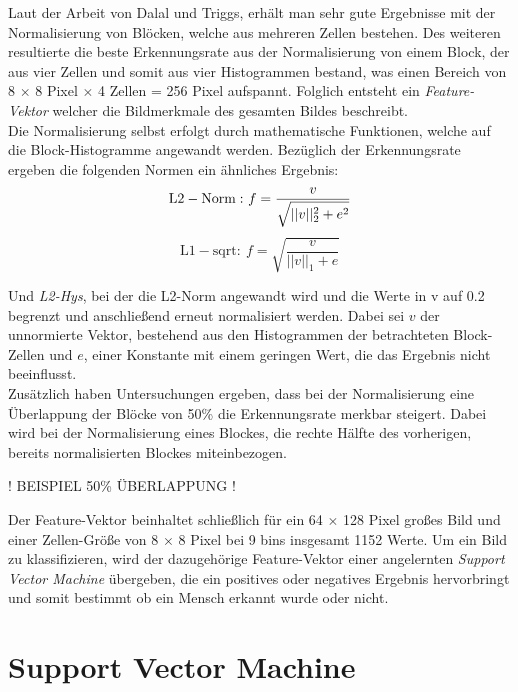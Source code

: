 Laut der Arbeit von Dalal und Triggs, erhält man sehr gute Ergebnisse mit der Normalisierung von Blöcken, welche aus mehreren Zellen bestehen. Des weiteren resultierte die beste Erkennungsrate aus der Normalisierung von einem Block, der aus vier Zellen und somit aus vier Histogrammen bestand, was einen Bereich von 8 $\times$ 8 Pixel $\times$ 4 Zellen = 256 Pixel aufspannt.
Folglich entsteht ein \emph{Feature-Vektor} welcher die Bildmerkmale des gesamten Bildes beschreibt.\\
Die Normalisierung selbst erfolgt durch mathematische Funktionen, welche auf die Block-Histogramme angewandt werden. Bezüglich der Erkennungsrate ergeben die folgenden Normen ein ähnliches Ergebnis:
$$\mathrm{L2-Norm:\ } f=\frac{v}{\sqrt{\strut{\lvert\lvert v \rvert\rvert^2_2+e^{2}}}}$$
\vspace{5 mm}
$$\mathrm{L1-sqrt:\ } f=\sqrt{\frac{v}{\lvert\lvert v \rvert\rvert_1+e}}$$

Und \emph{L2-Hys}, bei der die L2-Norm angewandt wird und die Werte in v auf 0.2 begrenzt und anschließend erneut normalisiert werden. Dabei sei $v$ der unnormierte Vektor, bestehend aus den Histogrammen der betrachteten Block-Zellen und $e$, einer Konstante mit einem geringen Wert, die das Ergebnis nicht beeinflusst.\\
Zusätzlich haben Untersuchungen ergeben, dass bei der Normalisierung eine Überlappung der Blöcke von 50\% die Erkennungsrate merkbar steigert. Dabei wird bei der Normalisierung eines Blockes, die rechte Hälfte des vorherigen, bereits normalisierten Blockes miteinbezogen.

\vspace{5 mm}
! BEISPIEL 50\% ÜBERLAPPUNG !
\vspace{5 mm}

Der Feature-Vektor beinhaltet schließlich für ein 64 $\times$ 128 Pixel großes Bild und einer Zellen-Größe von 8 $\times$ 8 Pixel bei 9 bins insgesamt 1152 Werte. Um ein Bild zu klassifizieren, wird der dazugehörige Feature-Vektor einer angelernten \emph{Support Vector Machine} übergeben, die ein positives oder negatives Ergebnis hervorbringt und somit bestimmt ob ein Mensch erkannt wurde oder nicht.

\section{Support Vector Machine}
\label{sec:grundlagensvm}

